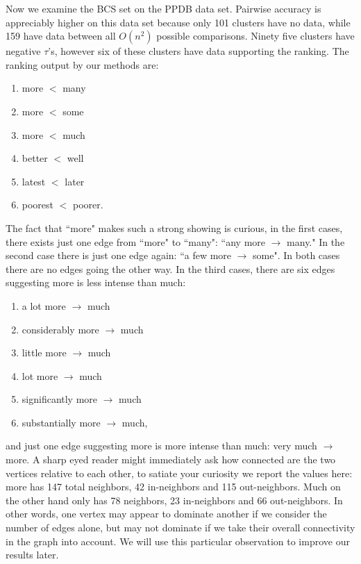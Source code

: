 Now we examine the BCS set on the PPDB data set. Pairwise accuracy is appreciably higher on this data set because only 101 clusters have no data, while 159 have data between all $O(n^2)$ possible comparisons. Ninety five clusters have negative $\tau$'s, however six of these clusters have data supporting the ranking. The ranking output by our methods are:

\begin{enumerate}
	\item more $<$ many
	\item more $<$ some
	\item more $<$ much
	\item better $<$ well
	\item latest $<$ later
	\item poorest $<$ poorer.
\end{enumerate}

The fact that ``more" makes such a strong showing is curious, in the first cases, there exists just one edge from ``more" to ``many": ``any more $\rightarrow$ many." In the second case there is just one edge again: ``a few more $\rightarrow$ some". In both cases there are no edges going the other way. In the third cases, there are six edges suggesting more is less intense than much:

\begin{enumerate}
	\item a lot more $\rightarrow$ much
	\item considerably more $\rightarrow$ much
	\item little more $\rightarrow$ much
	\item lot  more $\rightarrow$ much
	\item significantly more $\rightarrow$ much
	\item substantially more $\rightarrow$ much,
\end{enumerate}

and just one edge suggesting more is more intense than much: very much $\rightarrow$ more. A sharp eyed reader might immediately ask how connected are the two vertices relative to each other, to satiate your curiosity we report the values here: more has 147 total neighbors, 42 in-neighbors and 115 out-neighbors. Much on the other hand only has 78 neighbors, 23 in-neighbors and 66 out-neighbors. In other words, one vertex may appear to dominate another if we consider the number of edges alone, but may not dominate if we take their overall connectivity in the graph into account. We will use this particular observation to improve our results later. 

